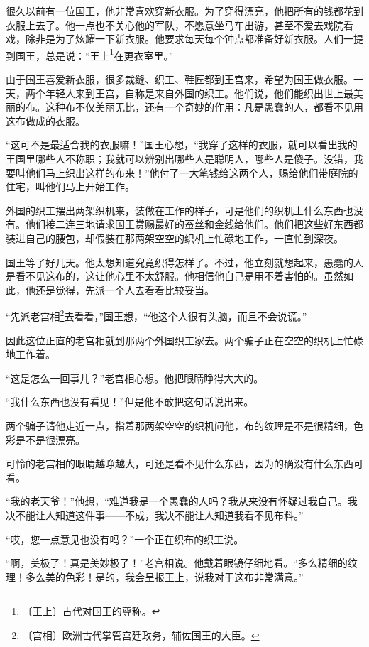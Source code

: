 \documentclass[12pt,UTF-8,openany]{ctexbook}
\begin{document}
\begin{normalsize}
    
    很久以前有一位国王，他非常喜欢穿新衣服。为了穿得漂亮，他把所有的钱都花到衣服上去了。他一点也不关心他的军队，不愿意坐马车出游，甚至不爱去戏院看戏，除非是为了炫耀一下新衣服。他要求每天每个钟点都准备好新衣服。人们一提到国王，总是说：“王上\footnote{〔王上〕古代对国王的尊称。}在更衣室里。”
    
    由于国王喜爱新衣服，很多裁缝、织工、鞋匠都到王宫来，希望为国王做衣服。一天，两个年轻人来到王宫，自称是来自外国的织工。他们说，他们能织出世上最美丽的布。这种布不仅美丽无比，还有一个奇妙的作用：凡是愚蠢的人，都看不见用这布做成的衣服。
    
    “这可不是最适合我的衣服嘛！”国王心想，“我穿了这样的衣服，就可以看出我的王国里哪些人不称职；我就可以辨别出哪些人是聪明人，哪些人是傻子。没错，我要叫他们马上织出这样的布来！”他付了一大笔钱给这两个人，赐给他们带庭院的住宅，叫他们马上开始工作。
    
    外国的织工摆出两架织机来，装做在工作的样子，可是他们的织机上什么东西也没有。他们接二连三地请求国王赏赐最好的蚕丝和金线给他们。他们把这些好东西都装进自己的腰包，却假装在那两架空空的织机上忙碌地工作，一直忙到深夜。
    
    国王等了好几天。他太想知道究竟织得怎样了。不过，他立刻就想起来，愚蠢的人是看不见这布的，这让他心里不太舒服。他相信他自己是用不着害怕的。虽然如此，他还是觉得，先派一个人去看看比较妥当。
    
    “先派老宫相\footnote{〔宫相〕欧洲古代掌管宫廷政务，辅佐国王的大臣。}去看看，”国王想，“他这个人很有头脑，而且不会说谎。”
    
    因此这位正直的老宫相就到那两个外国织工家去。两个骗子正在空空的织机上忙碌地工作着。
    
    “这是怎么一回事儿？”老宫相心想。他把眼睛睁得大大的。
    
    “我什么东西也没有看见！”但是他不敢把这句话说出来。
    
    两个骗子请他走近一点，指着那两架空空的织机问他，布的纹理是不是很精细，色彩是不是很漂亮。
    
    可怜的老宫相的眼睛越睁越大，可还是看不见什么东西，因为的确没有什么东西可看。
    
    “我的老天爷！”他想，“难道我是一个愚蠢的人吗？我从来没有怀疑过我自己。我决不能让人知道这件事——不成，我决不能让人知道我看不见布料。”
    
    “哎，您一点意见也没有吗？”一个正在织布的织工说。
    
    “啊，美极了！真是美妙极了！”老宫相说。他戴着眼镜仔细地看。“多么精细的纹理！多么美的色彩！是的，我会呈报王上，说我对于这布非常满意。”
    

\end{normalsize}
\end{document}
